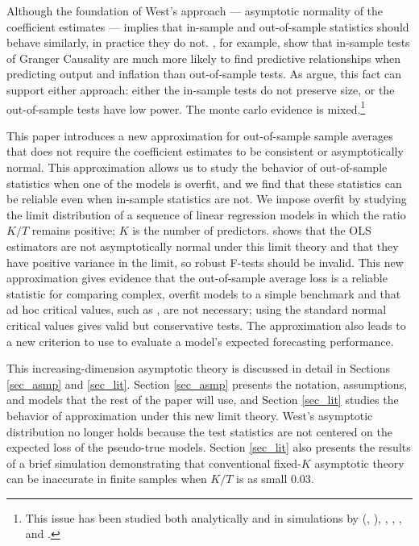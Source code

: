 \documentclass[11pt]{article} \def\baselinestretch{1.08}
\newcommand{\pp}[1]{#1} \newcommand{\intro}[1]{#1}
\newcommand{\solution}{} \newcommand{\point}[1]{#1}
\begin{document}
Although the foundation of West's approach --- asymptotic
normality of the coefficient estimates --- implies that in-sample
and out-of-sample statistics should behave similarly, in practice they
do not.  , for example, show that
in-sample tests of Granger Causality are much more likely to find
predictive relationships when predicting output and inflation than
out-of-sample tests. As  argue, this
fact can support either approach: either the in-sample tests do not
preserve size, or the out-of-sample tests have low power.  The monte
carlo evidence is mixed.\footnote{This issue has been studied both
  analytically and in simulations by
   (\citeyear*{inoue_in-sample_2005},
  \citeyear*{inoue_selection_2006}),
  , , 
  , and .}

\solution
\intro{This paper introduces a new approximation for out-of-sample
  sample averages
  that does not require the coefficient estimates to be consistent or
  asymptotically normal.  This approximation allows us to study the
  behavior of out-of-sample statistics when one of the models is
  overfit, and we find that these statistics can be reliable even when
  in-sample statistics are not.  We impose overfit by studying
  the limit distribution of a sequence of linear regression models in
  which the ratio $K/T$ remains positive; $K$ is the number of
  predictors.  \citeasnoun{huber_robust_1973} shows that the OLS
  estimators are not asymptotically normal under this limit theory and
  that they have positive variance in the limit, so robust F-tests
  should be invalid. \pp{This new approximation
    gives evidence that the out-of-sample average loss is a reliable
    statistic for comparing complex, overfit models to a simple
    benchmark and that ad hoc critical values, such as
    \possessivecite{clark_tests_2001}, are not necessary; using the
    standard normal critical values gives valid but conservative
    tests.  The approximation also leads to a new criterion to use to
    evaluate a model's expected forecasting performance.}}

\pp{This increasing-dimension asymptotic theory is discussed in detail
  in Sections \ref{sec_asmp} and \ref{sec_lit}.}  Section
  \ref{sec_asmp} presents the notation, assumptions, and models that
  the rest of the paper will use, and Section \ref{sec_lit} studies
  the behavior of  approximation
  under this new limit theory.  West's asymptotic distribution no
  longer holds because the
  test statistics are not centered on the expected loss of the
  pseudo-true models. Section \ref{sec_lit} also presents the results
  of a brief  
simulation demonstrating that conventional fixed-$K$ asymptotic theory
can be inaccurate in finite samples when $K/T$ is as small $0.03$.
\end{document}
